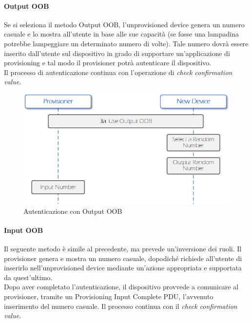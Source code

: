 \paragraph{Output OOB}
Se si seleziona il metodo Output OOB, l'unprovisioned device genera un numero casuale e lo mostra all'utente in base alle sue capacità (se fosse una lampadina potrebbe lampeggiare un determinato numero di volte). Tale numero dovrà essere inserito dall'utente sul dispositivo in grado di supportare un'applicazione di provisioning e tal modo il provisioner potrà autenticare il dispositivo. \\
Il processo di autenticazione continua con l'operazione di \textit{check confirmation value}.

\begin{figure}[!ht]
    \centering
    \includegraphics[width = \textwidth]{images/Provisioning_OOB_output.png}
    \caption{Autenticazione con Output OOB}
    \label{fig:provisioning_output_OOB}
\end{figure}

\paragraph{Input OOB}
Il seguente metodo è simile al precedente, ma prevede un'inversione dei ruoli. Il provisioner genera e mostra un numero casuale, dopodiché richiede all'utente di inserirlo nell'unprovisioned device mediante un'azione appropriata e supportata da quest'ultimo.\\
Dopo aver completato l'autenticazione, il dispositivo provvede a comunicare al provisioner, tramite un Provisioning Input Complete PDU, l'avvenuto inserimento del numero casuale. Il processo continua con il \textit{check confirmation value}.

